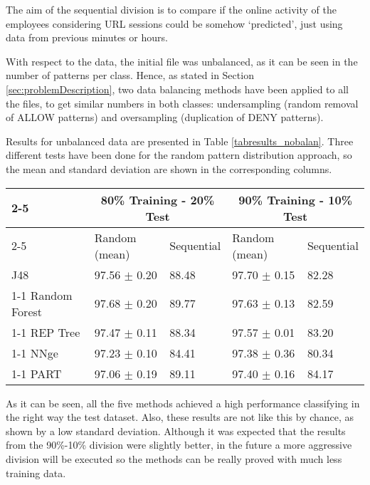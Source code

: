 \documentclass{llncs}
\begin{document}
The aim of the sequential division is to compare if the online activity of the employees considering URL sessions could be somehow `predicted', just using data from previous minutes or hours.

With respect to the data, the initial file was unbalanced, as it can be seen in the number of patterns per class. Hence, as stated in Section \ref{sec:problemDescription}, two data balancing methods have been applied to all the files, to get similar numbers in both classes: undersampling (random removal of ALLOW patterns) and oversampling (duplication of DENY patterns).

Results for unbalanced data are presented in Table \ref{tabresults_nobalan}.
Three different tests have been done for the random pattern distribution approach, so the mean and standard deviation are shown in the corresponding columns.

\begin{table*}[htpb]
\centering
 \caption{\label{tabresults_nobalan} Percentage of correctly classified patterns for non-balanced data}
{\small
\begin{tabular}{|l|l|l|l|l|}
\cline{2-5}
\multicolumn{1}{l|}{} & \multicolumn{2}{c|}{80\% Training - 20\% Test} & \multicolumn{2}{c|}{90\% Training - 10\% Test} \\ 
\cline{2-5}
\multicolumn{1}{l|}{} & Random (mean) & Sequential & Random (mean) & Sequential \\ 
\hline
J48 & 97.56 $\pm$ 0.20 & 88.48 & 97.70 $\pm$ 0.15 & 82.28 \\ 
\cline{1-1}
Random Forest & 97.68 $\pm$ 0.20 & 89.77 & 97.63 $\pm$ 0.13 & 82.59 \\ 
\cline{1-1}
REP Tree & 97.47 $\pm$ 0.11 & 88.34 & 97.57 $\pm$ 0.01 & 83.20 \\ 
\cline{1-1}
NNge & 97.23 $\pm$ 0.10 & 84.41 & 97.38 $\pm$ 0.36 & 80.34 \\ 
\cline{1-1}
PART & 97.06 $\pm$ 0.19 & 89.11 & 97.40 $\pm$ 0.16 & 84.17 \\ 
\hline
\end{tabular}
}
\end{table*}
 
As it can be seen, all the five methods achieved a high performance classifying in the right way the test dataset. Also, these results are not like this by chance, as shown by a low standard deviation. Although it was expected that the results from the 90\%-10\% division were slightly better, in the future a more aggressive division will be executed so the methods can be really proved with much less training data.
\end{document}
